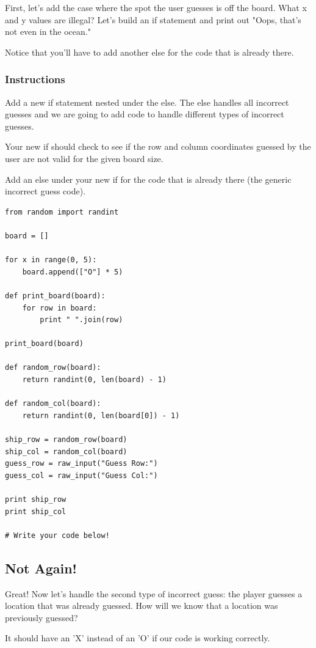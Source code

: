 \documentclass[12pt,a4paper,final,twoside,onecolumn,titlepage]{book}
\begin{document}
First, let’s add the case where the spot the user guesses is off the board. What x and y values are illegal? Let’s build an if statement and print out "Oops, that's not even in the ocean."

Notice that you'll have to add another else for the code that is already there.
\subsubsection{Instructions}

Add a new if statement nested under the else. The else handles all incorrect guesses and we are going to add code to handle different types of incorrect guesses.

Your new if should check to see if the row and column coordinates guessed by the user are not valid for the given board size.

Add an else under your new if for the code that is already there (the generic incorrect guess code).

\begin{lstlisting}
from random import randint

board = []

for x in range(0, 5):
    board.append(["O"] * 5)

def print_board(board):
    for row in board:
        print " ".join(row)

print_board(board)

def random_row(board):
    return randint(0, len(board) - 1)

def random_col(board):
    return randint(0, len(board[0]) - 1)

ship_row = random_row(board)
ship_col = random_col(board)
guess_row = raw_input("Guess Row:")
guess_col = raw_input("Guess Col:")

print ship_row
print ship_col

# Write your code below!

\end{lstlisting}

\subsection{Not Again!}

Great! Now let's handle the second type of incorrect guess: the player guesses a location that was already guessed. How will we know that a location was previously guessed?

It should have an 'X' instead of an 'O' if our code is working correctly.
\end{document}
